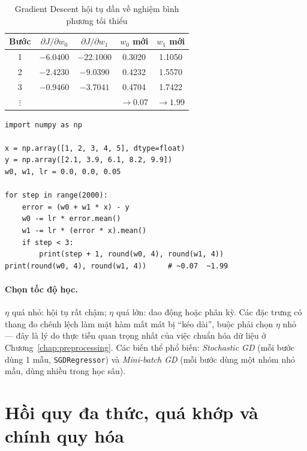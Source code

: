 \begin{table}[H]
\centering
\begin{tabular}{|c|c|c|c|c|}
\hline
\textbf{Bước} & $\partial J / \partial w_0$ & $\partial J / \partial w_1$ & $w_0$ mới & $w_1$ mới \\
\hline
1 & $-6.0400$ & $-22.1000$ & 0.3020 & 1.1050 \\ \hline
2 & $-2.4230$ & $-9.0390$ & 0.4232 & 1.5570 \\ \hline
3 & $-0.9460$ & $-3.7041$ & 0.4704 & 1.7422 \\ \hline
$\vdots$ & & & $\to 0.07$ & $\to 1.99$ \\ \hline
\end{tabular}
\caption{Gradient Descent hội tụ dần về nghiệm bình phương tối thiểu}
\end{table}

\begin{lstlisting}[caption={Cài đặt Gradient Descent cho hồi quy tuyến tính}]
import numpy as np

x = np.array([1, 2, 3, 4, 5], dtype=float)
y = np.array([2.1, 3.9, 6.1, 8.2, 9.9])
w0, w1, lr = 0.0, 0.0, 0.05

for step in range(2000):
    error = (w0 + w1 * x) - y
    w0 -= lr * error.mean()
    w1 -= lr * (error * x).mean()
    if step < 3:
        print(step + 1, round(w0, 4), round(w1, 4))
print(round(w0, 4), round(w1, 4))     # ~0.07  ~1.99
\end{lstlisting}

\paragraph{Chọn tốc độ học.} $\eta$ quá nhỏ: hội tụ rất chậm; $\eta$ quá lớn: dao động hoặc phân kỳ. Các đặc trưng có thang đo chênh lệch làm mặt hàm mất mát bị ``kéo dài'', buộc phải chọn $\eta$ nhỏ --- đây là lý do thực tiễn quan trọng nhất của việc chuẩn hóa dữ liệu ở Chương~\ref{chap:preprocessing}. Các biến thể phổ biến: \textit{Stochastic GD} (mỗi bước dùng 1 mẫu, \texttt{SGDRegressor}) và \textit{Mini-batch GD} (mỗi bước dùng một nhóm nhỏ mẫu, dùng nhiều trong học sâu).


\section{Hồi quy đa thức, quá khớp và chính quy hóa}

